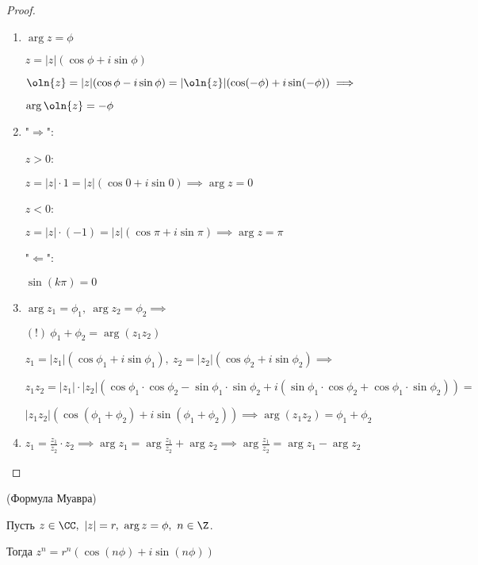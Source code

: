 \begin{proof}
    \begin{enumerate}
        \item $\arg z = \phi$
        
        $z = |z|(\cos\phi + i\sin\phi)$
        
        $\oln{z} = |z|(\cos\phi - i\sin\phi) = |\oln{z}|(\cos(-\phi) + i\sin(-\phi)) \implies$
        
        $\arg \oln{z} = -\phi$

        \item "$\Rightarrow$":
        
        $z > 0$: 
        
        $z = |z| \cdot 1 = |z|(\cos 0 + i\sin 0) \implies \arg z = 0$
        
        $z < 0$: 
        
        $z = |z| \cdot (-1) = |z|(\cos \pi + i\sin \pi) \implies \arg z = \pi$
        
        "$\Leftarrow$":
        
        $\sin(k \pi) = 0$

        \item $\arg z_1 = \phi_1,~\arg z_2 = \phi_2 \implies$
        
        $(!)~\phi_1 + \phi_2 = \arg(z_1 z_2)$
        
        $z_1 = |z_1|(\cos\phi_1 + i\sin\phi_1),~z_2 = |z_2|(\cos\phi_2 + i\sin\phi_2) \implies$
        
        $z_1 z_2 = |z_1| \cdot |z_2|(\cos\phi_1 \cdot \cos\phi_2 - \sin\phi_1 \cdot \sin\phi_2 + i(\sin\phi_1 \cdot \cos\phi_2 + \cos\phi_1 \cdot \sin\phi_2)) =$
        
        $|z_1 z_2|(\cos(\phi_1 + \phi_2) + i\sin(\phi_1 + \phi_2)) \implies \arg(z_1 z_2) = \phi_1 + \phi_2$

        \item $z_1 = \frac{z_1}{z_2} \cdot z_2 \implies \arg z_1 = \arg \frac{z_1}{z_2} + \arg z_2 \implies \arg \frac{z_1}{z_2} = \arg z_1 - \arg z_2$

    \end{enumerate}
\end{proof}

\begin{follow}(Формула Муавра)

    Пусть $z \in \CC,~|z| = r,~\arg z = \phi,~n \in \Z$.

    Тогда $z^n = r^n(\cos(n\phi) + i\sin(n\phi))$
\end{follow}

